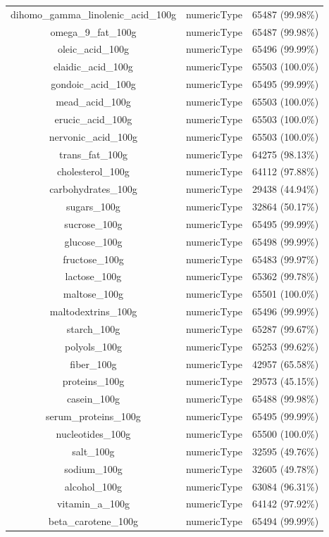 \documentclass[11pt]{article}
\begin{document}
\begin{center}
\begin{longtable}{|c|c|r|}
dihomo\_gamma\_linolenic\_acid\_100g& numericType& 65487 (99.98\%)\\
omega\_9\_fat\_100g& numericType& 65487 (99.98\%)\\
oleic\_acid\_100g& numericType& 65496 (99.99\%)\\
elaidic\_acid\_100g& numericType& 65503 (100.0\%)\\
gondoic\_acid\_100g& numericType& 65495 (99.99\%)\\
mead\_acid\_100g& numericType& 65503 (100.0\%)\\
erucic\_acid\_100g& numericType& 65503 (100.0\%)\\
nervonic\_acid\_100g& numericType& 65503 (100.0\%)\\
trans\_fat\_100g& numericType& 64275 (98.13\%)\\
cholesterol\_100g& numericType& 64112 (97.88\%)\\
carbohydrates\_100g& numericType& 29438 (44.94\%)\\
sugars\_100g& numericType& 32864 (50.17\%)\\
sucrose\_100g& numericType& 65495 (99.99\%)\\
glucose\_100g& numericType& 65498 (99.99\%)\\
fructose\_100g& numericType& 65483 (99.97\%)\\
lactose\_100g& numericType& 65362 (99.78\%)\\
maltose\_100g& numericType& 65501 (100.0\%)\\
maltodextrins\_100g& numericType& 65496 (99.99\%)\\
starch\_100g& numericType& 65287 (99.67\%)\\
polyols\_100g& numericType& 65253 (99.62\%)\\
fiber\_100g& numericType& 42957 (65.58\%)\\
proteins\_100g& numericType& 29573 (45.15\%)\\
casein\_100g& numericType& 65488 (99.98\%)\\
serum\_proteins\_100g& numericType& 65495 (99.99\%)\\
nucleotides\_100g& numericType& 65500 (100.0\%)\\
salt\_100g& numericType& 32595 (49.76\%)\\
sodium\_100g& numericType& 32605 (49.78\%)\\
alcohol\_100g& numericType& 63084 (96.31\%)\\
vitamin\_a\_100g& numericType& 64142 (97.92\%)\\
beta\_carotene\_100g& numericType& 65494 (99.99\%)\\

\end{longtable}
\end{center}
\end{document}
